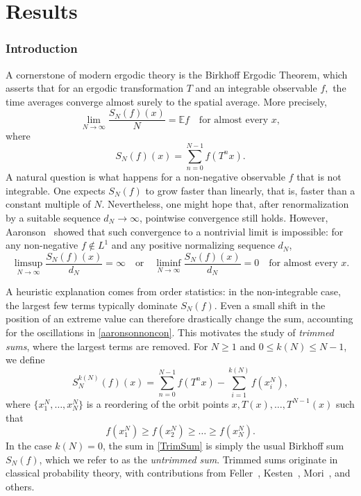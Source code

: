 \documentclass[11pt,twoside,a4paper,reqno]{amsart}
\newcommand{\E}{\mathbb{E}}
\begin{document}
\part{Results}

\section{Introduction}
A cornerstone of modern ergodic theory is the Birkhoff Ergodic Theorem, which asserts that for an ergodic transformation $T$ and an integrable observable $f,$ the time averages converge almost surely to the spatial average. More precisely,
\begin{equation*}
\lim_{N\to\infty} \frac{S_N(f)(x)}{N} = \E f \quad \text{for almost every } x,
\end{equation*}
where
$$
S_N(f)(x) = \sum_{n=0}^{N-1} f(T^n x).
$$
A natural question is what happens for a non-negative observable $f$ that is not integrable. One expects $S_N(f)$ to grow faster than linearly, that is, faster than a constant multiple of $N$. Nevertheless, one might hope that, after renormalization by a suitable sequence $d_N \to \infty$, pointwise convergence still holds. However, Aaronson~\cite{aaronsoninf} showed that such convergence to a nontrivial limit is impossible: for any non-negative $f\notin L^1$ and any positive normalizing sequence $d_N$,
\begin{equation}\label{aaronsonnoncon}
\limsup_{N\to\infty} \frac{S_N(f)(x)}{d_N} = \infty
\quad \text{or} \quad
\liminf_{N\to\infty} \frac{S_N(f)(x)}{d_N} = 0
\quad \text{for almost every } x.
\end{equation}


A heuristic explanation comes from order statistics: in the non-integrable case, the largest few terms typically dominate $S_N(f)$. Even a small shift in the position of an extreme value can therefore drastically change the sum, accounting for the oscillations in \eqref{aaronsonnoncon}. This motivates the study of \emph{trimmed sums}, where the largest terms are removed. For $N \geq 1$ and $0 \leq k(N) \leq N-1$, we define
\begin{equation}\label{TrimSum}
S_N^{k(N)}(f)(x) = \sum_{n=0}^{N-1} f(T^n x) - \sum_{i=1}^{k(N)} f(x_i^N),
\end{equation}
where $\{x_1^N, \dots, x_N^N\}$ is a reordering of the orbit points $x, T(x), \dots, T^{N-1}(x)$ such that
\begin{equation*}
f(x_1^N) \geq f(x_2^N) \geq \dots \geq f(x_N^N).
\end{equation*}
In the case $k(N)=0$, the sum in \eqref{TrimSum} is simply the usual Birkhoff sum $S_N(f)$, which we refer to as the \emph{untrimmed sum}. Trimmed sums originate in classical probability theory, with contributions from Feller~\cite{F68}, Kesten~\cite{kestenweak,kesten1992ratios}, Mori~\cite{morilighttrim,mori2}, and others.
\end{document}
